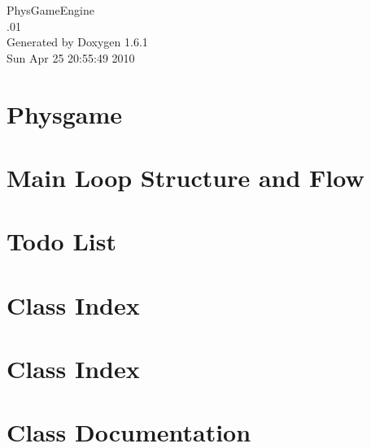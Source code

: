 \documentclass[a4paper]{book}
\begin{document}
\hypersetup{pageanchor=false}
\begin{titlepage}
\vspace*{7cm}
\begin{center}
{\Large PhysGameEngine \\[1ex]\large .01 }\\
\vspace*{1cm}
{\large Generated by Doxygen 1.6.1}\\
\vspace*{0.5cm}
{\small Sun Apr 25 20:55:49 2010}\\
\end{center}
\end{titlepage}
\clearemptydoublepage
{}
\tableofcontents
\clearemptydoublepage
{}
\hypersetup{pageanchor=true}
\chapter{Physgame}
\label{index}\hypertarget{index}{}
\chapter{Main Loop Structure and Flow}
\label{mainloop1}
\hypertarget{mainloop1}{}

\chapter{Todo List}
\label{todo}
\hypertarget{todo}{}

\chapter{Class Index}

\chapter{Class Index}

\chapter{Class Documentation}















\printindex
\end{document}
